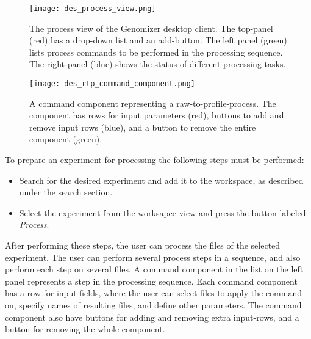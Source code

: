 \begin{figure}[h]
	\texttt{[image: des\_process\_view.png]}
	\caption{The process view of the Genomizer desktop client. The top-panel (red) has a drop-down list and an add-button. The left panel (green) lists process commands to be performed in the processing sequence. The right panel (blue) shows the status of different processing tasks.}
	\label{fig:des_process-view}
\end{figure}

\begin{figure}[h]
	\texttt{[image: des\_rtp\_command\_component.png]}
	\caption{A command component representing a raw-to-profile-process. The component has rows for input parameters (red), buttons to add and remove input rows (blue), and a button to remove the entire component (green).}
	\label{fig:des_rtp-command-component}
\end{figure}

To prepare an experiment for processing the following steps must be performed:
\begin{itemize}
	\item Search for the desired experiment and add it to the workspace, as described under the search section.
	\item Select the experiment from the worksapce view and press the button labeled 	\textit{Process}.
\end{itemize}
After performing these steps, the user can process the files of the selected experiment. The user can perform several process steps in a sequence, and also perform each step on several files. A command component in the list on the left panel represents a step in the processing sequence. Each command component has a row for input fields, where the user can select files to apply the command on, specify names of resulting files, and define other parameters. The command component also have buttons for adding and removing extra input-rows, and a button for removing the whole component.

